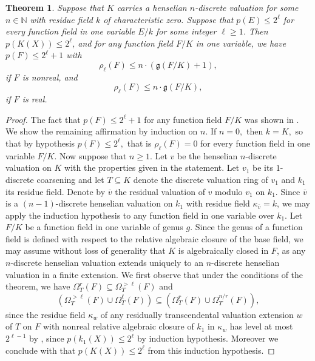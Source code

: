 \documentclass[a4paper,12pt,reqno]{amsart}
\newtheorem{thm}{Theorem}[section]
\theoremstyle{definition}
\numberwithin{equation}{thm}
\renewcommand{\leq}{\leqslant}
\renewcommand{\geq}{\geqslant}
\begin{document}
\begin{thm}\label{sumsofsquaresbound} Suppose that $K$ carries a henselian $n$-discrete valuation for some $n\in \mathbb{N}$ with residue field $k$ of characteristic zero. Suppose that  $p(E)\leq 2^{\ell}$ for every function field in one variable $E/k$ for some integer $\ell\geq 1$.  
Then $p(K(X)) \leq 2^\ell$, and for any function field $F/K$ in one variable, we have $p(F) \leq 2^\ell + 1$ with  $$\rho_{\ell}(F) \leq n\cdot (\mathfrak{g}(F/K)+1),$$ if $F$ is nonreal, and  $$\rho_{\ell}(F) \leq n\cdot \mathfrak{g}(F/K),$$
if $F$ is real.
\end{thm}
\begin{proof} The fact that $p(F) \leq 2^\ell + 1 $  for any function field $F/K$ was shown in \cite[Corollary 1.5]{BDGMZ}. 
We show  the remaining affirmation by induction on $n.$ If $n=0,$ then $k=K,$ so that by hypothesis $p(F)\leq 2^{\ell},$ that is $\rho_{\ell}(F)=0$ for every function field in one variable $F/K$. Now suppose that $n\geq 1$. Let $v$ be the henselian $n$-discrete valuation on $K$ with the properties given in the statement. Let $v_1$ be its $1$-discrete coarsening and let $T\subseteq K$ denote the discrete valuation ring of $v_1$ and $k_1$ its residue field. Denote by $\overline{v}$ the residual valuation of $v$ modulo $v_1$ on $k_1$. Since $\overline{v}$ is a $(n-1)$-discrete henselian valuation on $k_1$ with residue field $\kappa_{\overline{v}}=k$, we may apply the induction hypothesis to any function field in one variable over $k_1$. 
Let $F/K$ be a function field in one variable of genus $g$. Since the genus of a function field is defined with respect to the relative algebraic closure of the base field, we may assume without loss of generality that $K$ is algebraically closed in $F$, as any $n$-discrete henselian valuation  extends uniquely  to an $n$-discrete henselian valuation in a finite extension.   
We first observe that under the conditions of the theorem, we have $\Omega^{r}_T(F) \subseteq \Omega^{>\ell}_T(F)$
and 
$$ \left(\Omega^{>\ell}_T(F) \cup \Omega^\ell_T(F)\right) \subseteq \left(\Omega^{r}_T(F) \cup \Omega^{n/r}_T(F) \right),
$$
since the residue field $\kappa_w$ of any residually transcendental valuation extension $w$ of $T$ on $F$ with nonreal relative algebraic closure of $k_1$ in $\kappa_w$  has level at most $2^{\ell-1}$ by \cite[Theorem 3.5]{BVG}, since $p(k_1(X)) \leq 2^\ell$ by induction hypothesis. Moreover we conclude with  
\cite[Theorem 6.10]{BGVG14} that $p(K(X))\leq 2^{\ell}$ from this induction hypothesis. 


\end{proof}
\end{document}
